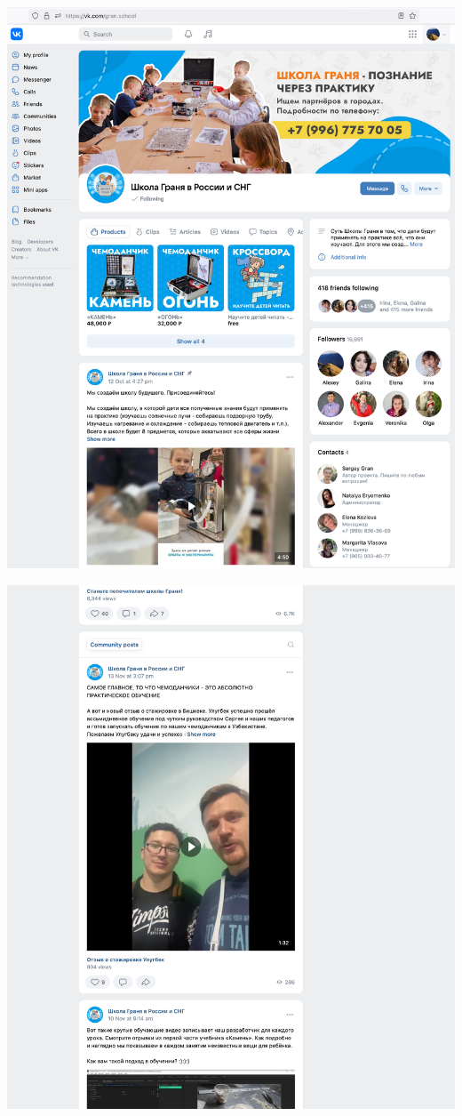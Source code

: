 \begin{center}
    \includegraphics[width=\textwidth]{school-vk-p1}
\end{center}
\WillContinue
\pagebreak

\Continuing
\begin{center}
    \includegraphics[width=\textwidth]{school-vk-p2}
\end{center}
\WillContinue
\pagebreak

